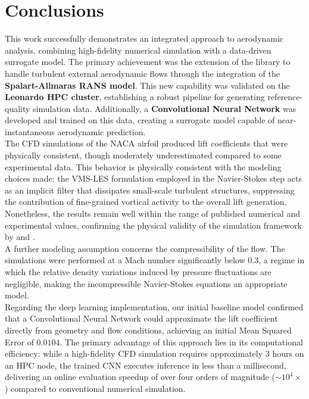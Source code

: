 \section{Conclusions}
\label{sec:05_Conclusions}

This work successfully demonstrates an integrated approach to aerodynamic analysis, combining high-fidelity numerical simulation with a data-driven surrogate model. The primary achievement was the extension of the \textbf{\lifex} library to handle turbulent external aerodynamic flows through the integration of the \textbf{Spalart-Allmaras RANS model}. This new capability was validated on the \textbf{Leonardo HPC cluster}, establishing a robust pipeline for generating reference-quality simulation data. Additionally, a \textbf{Convolutional Neural Network} was developed and trained on this data, creating a surrogate model capable of near-instantaneous aerodynamic prediction.\\

The CFD simulations of the NACA airfoil produced lift coefficients that were physically consistent, though moderately underestimated compared to some experimental data. This behavior is physically consistent with the modeling choices made: the VMS-LES formulation employed in the Navier-Stokes step acts as an implicit filter that dissipates small-scale turbulent structures, suppressing the contribution of fine-grained vortical activity to the overall lift generation. Nonetheless, the results remain well within the range of published numerical and experimental values, confirming the physical validity of the simulation framework by \cite{ladson1988} and \cite{mccroskey1988}.\\

A further modeling assumption concerns the compressibility of the flow. The simulations were performed at a Mach number significantly below $0.3$, a regime in which the relative density variations induced by pressure fluctuations are negligible, making the incompressible Navier-Stokes equations an appropriate model.\\

Regarding the deep learning implementation, our initial baseline model confirmed that a Convolutional Neural Network could approximate the lift coefficient directly from geometry and flow conditions, achieving an initial Mean Squared Error of $0.0104$. The primary advantage of this approach lies in its computational efficiency: while a high-fidelity CFD simulation requires approximately 3 hours on an HPC node, the trained CNN executes inference in less than a millisecond, delivering an online evaluation speedup of over four orders of magnitude ($\sim 10^4\times$) compared to conventional numerical simulation.\\

